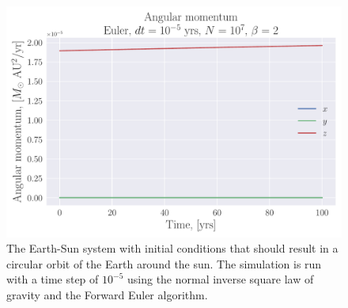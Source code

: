 \documentclass[reprint, english,notitlepage,nofootinbib]{revtex4-1}  %
\begin{document}
\begin{figure}
  \includegraphics[width=\linewidth]{../output/earth_sun_circ-euler-5-7-2_ang_mom.pdf}
  \caption{The Earth-Sun system with initial conditions that should result in a circular orbit of the Earth around the sun. The simulation is run with a time step of $10^{-5}$ using the normal inverse square law of gravity and the Forward Euler algorithm.}
  \label{fig:earth_sun_circ_euler_dt=5}
\end{figure}
\end{document}

